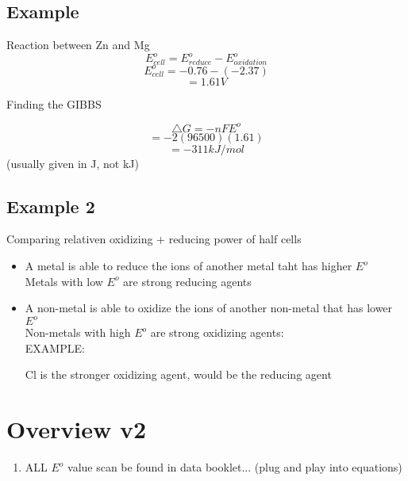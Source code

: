 \documentclass{article}
\begin{document}
\subsection{Example}
Reaction between Zn and Mg
$$E^{o}_{cell} = E^{o}_{reduce} - E^{o}_{oxidation}$$
$$E^{o}_{cell} = -0.76 - (-2.37)$$
$$=1.61V$$

Finding the GIBBS

$$\triangle{G} = -nFE^{o}$$
$$=-2(96500)(1.61)$$
$$=-311kJ/mol$$ (usually given in J, not kJ)

\subsection{Example 2}
Comparing relativen oxidizing + reducing power of half cells
\begin{itemize}
\item A metal is able to reduce the ions of another metal taht has higher $E^{o}$\\Metals with low $E^{o}$ are strong reducing agents
\item A non-metal is able to oxidize the ions of another non-metal that has lower $E^{o}$\\Non-metals with high $E^{o}$ are strong oxidizing agents:\\
EXAMPLE: \\

Cl is the stronger oxidizing agent,  would be the reducing agent
\end{itemize}

\section{Overview v2}
\begin{enumerate}
\item ALL $E^{o}$ value scan be found in data booklet... (plug and play into equations)
\end{enumerate}
\end{document}
